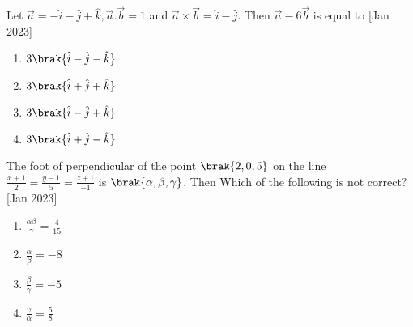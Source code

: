     \item Let $\overrightarrow{a}=-\hat{i}-\hat{j}+\hat{k}, \overrightarrow{a}.\overrightarrow{b}=1$ and $\overrightarrow{a}\times \overrightarrow{b}=\hat{i}-\hat{j}$. Then $\overrightarrow{a}-6\overrightarrow{b}$ is equal to 
     \hfill{[Jan 2023]}
		\begin{multicols}{1}
			\begin{enumerate}
				\item $3\brak{\hat{i}-\hat{j}-\hat{k}}$
    \item $3\brak{\hat{i}+\hat{j}+\hat{k}}$
    \item $3\brak{\hat{i}-\hat{j}+\hat{k}}$
    \item $3\brak{\hat{i}+\hat{j}-\hat{k}}$
			\end{enumerate}
		\end{multicols}

    \item The foot of perpendicular of the point $\brak{2,0,5}$ on the line $\frac{x+1}{2}=\frac{y-1}{5}=\frac{z+1}{-1}$ is $\brak{\alpha,\beta,\gamma}$. Then Which of the following is not correct?
     \hfill{[Jan 2023]}
		\begin{multicols}{1}
			\begin{enumerate}

				\item $\frac{\alpha \beta}{\gamma}=\frac{4}{15}$
    \item $\frac{\alpha }{\beta}=-8$
     \item $\frac{\beta }{\gamma}=-5$
      \item $\frac{\gamma }{\alpha}=\frac{5}{8}$
			\end{enumerate}
		\end{multicols}


